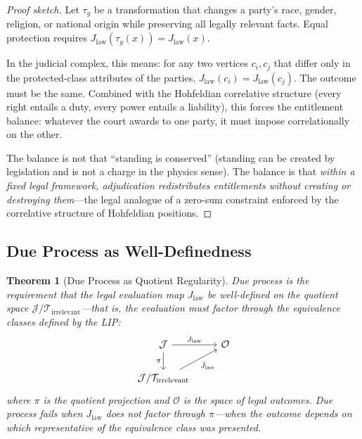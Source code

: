 \documentclass[12pt]{article}
\newtheorem{theorem}{Theorem}[section]
\theoremstyle{definition}
\theoremstyle{remark}
\newcommand{\J}{\mathcal{J}}               %
\begin{document}
\begin{proof}[Proof sketch]
Let $\tau_g$ be a transformation that changes a party's race, gender, religion, or national origin while preserving all legally relevant facts.  Equal protection requires $J_{\text{law}}(\tau_g(x)) = J_{\text{law}}(x)$.

In the judicial complex, this means: for any two vertices $c_i, c_j$ that differ only in the protected-class attributes of the parties, $J_{\text{law}}(c_i) = J_{\text{law}}(c_j)$.  The outcome must be the same.  Combined with the Hohfeldian correlative structure (every right entails a duty, every power entails a liability), this forces the entitlement balance: whatever the court awards to one party, it must impose correlationally on the other.

The balance is not that ``standing is conserved'' (standing can be created by legislation and is not a charge in the physics sense).  The balance is that \emph{within a fixed legal framework, adjudication redistributes entitlements without creating or destroying them}---the legal analogue of a zero-sum constraint enforced by the correlative structure of Hohfeldian positions.
\end{proof}

\subsection{Due Process as Well-Definedness}

\begin{theorem}[Due Process as Quotient Regularity]
\label{thm:due_process}
Due process is the requirement that the legal evaluation map $J_{\text{law}}$ be \emph{well-defined on the quotient space} $\J / \mathcal{T}_{\text{irrelevant}}$---that is, the evaluation must factor through the equivalence classes defined by the LIP:
\begin{equation}
\begin{tikzcd}
\J \arrow[r, "J_{\text{law}}"] \arrow[d, "\pi"'] & \mathcal{O} \\
\J / \mathcal{T}_{\text{irrelevant}} \arrow[ur, "\bar{J}_{\text{law}}"']
\end{tikzcd}
\label{eq:due_process}
\end{equation}
where $\pi$ is the quotient projection and $\mathcal{O}$ is the space of legal outcomes.  Due process fails when $J_{\text{law}}$ does not factor through $\pi$---when the outcome depends on which representative of the equivalence class was presented.
\end{theorem}
\end{document}
